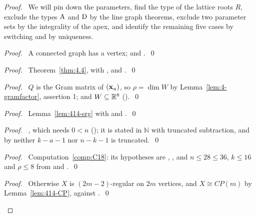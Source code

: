 \begin{proof}
 \pfsketch\ We will pin down the parameters, find the type of the lattice roots $R$, exclude the
 types $\mathrm{A}$ and $\mathrm{D}$ by the line graph theorems, exclude two parameter sets by the
 integrality of the apex, and identify the remaining five cases by switching and by uniqueness.
 \begin{proof}\pf\ A connected graph has a vertex;  and
  .~\qed\end{proof}
 \begin{proof}\pf\ Theorem~\ref{thm:4.4}, with ,  and
  .~\qed\end{proof}
 \begin{proof}\pf\ $Q$ is the Gram matrix of $({\mathbf x}_u)$, so $\rho=\dim W$ by
  Lemma~\ref{lem:4-gramfactor}, assertion 1; and $W\subseteq{\mathbb R}^8$
  ().~\qed\end{proof}
 \begin{proof}\pf\ Lemma~\ref{lem:414-srg} with  and .~\qed\end{proof}
 \begin{proof}\pf\ , which needs $0<n$ ();
  it is stated in $\mathbb N$ with truncated subtraction, and by  neither
  $k-a-1$ nor $n-k-1$ is truncated.~\qed\end{proof}
 \begin{proof}\pf\ Computation~\ref{comp:C18}: its hypotheses are ,
  , and $n\le28\le36$, $k\le16$ and $\rho\le8$ from  and
  .~\qed\end{proof}
 \begin{proof}\pf\ Otherwise $X$ is $(2m-2)$-regular on $2m$ vertices, and $X\cong CP(m)$ by
  Lemma~\ref{lem:414-CP}, against .~\qed\end{proof}

\end{proof}
